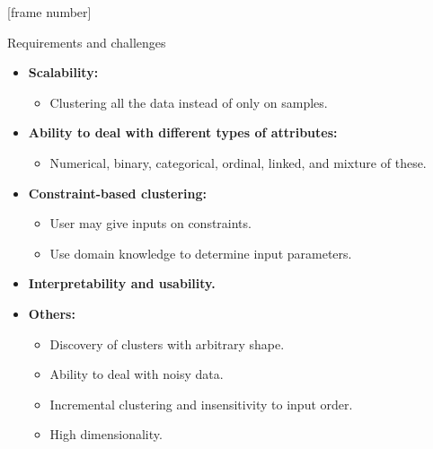 \documentclass[aspectratio=169,t,xcolor=dvipsnames]{beamer}
\begin{document}
  {
    [frame number]
    \begin{frame}{Requirements and challenges}
        \begin{itemize}
          \item \textbf{Scalability:}
          \begin{itemize}
            \item Clustering all the data instead of only on samples.
          \end{itemize}
          \item \textbf{Ability to deal with different types of attributes:}
          \begin{itemize}
            \item Numerical, binary, categorical, ordinal, linked, and mixture of these.
          \end{itemize}
          \item \textbf{Constraint-based clustering:}
          \begin{itemize}
            \item User may give inputs on constraints.
            \item Use domain knowledge to determine input parameters.
          \end{itemize}
          \item \textbf{Interpretability and usability.}
          \item \textbf{Others:}
          \begin{itemize}
            \item Discovery of clusters with arbitrary shape.
            \item Ability to deal with noisy data.
            \item Incremental clustering and insensitivity to input order.
            \item High dimensionality.
          \end{itemize}
        \end{itemize}
    \end{frame}
  }
\end{document}

